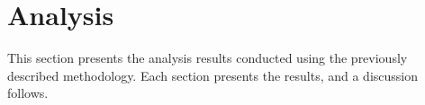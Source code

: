 \chapter{Analysis} \label{chapter:eval}

This section presents the analysis results conducted using the previously described methodology.
Each section presents the results, and a discussion follows.



